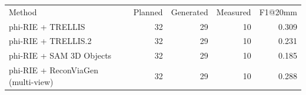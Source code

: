 \begin{tabular}{lrrrr}
Method & Planned & Generated & Measured & F1@20mm \\
phi-RIE + TRELLIS & 32 & 29 & 10 & 0.309 \\
phi-RIE + TRELLIS.2 & 32 & 29 & 10 & 0.231 \\
phi-RIE + SAM 3D Objects & 32 & 29 & 10 & 0.185 \\
phi-RIE + ReconViaGen (multi-view) & 32 & 29 & 10 & 0.288 \\
\end{tabular}
